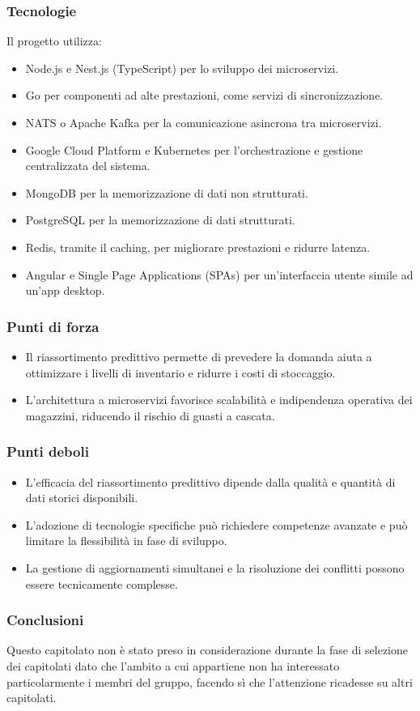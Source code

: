     \subsubsection{Tecnologie}
    Il progetto utilizza:

\begin{itemize}
    \item Node.js e Nest.js (TypeScript) per lo sviluppo dei microservizi.
    \item Go per componenti ad alte prestazioni, come servizi di sincronizzazione.
    \item NATS o Apache Kafka per la comunicazione asincrona tra microservizi.
    \item Google Cloud Platform e Kubernetes per l’orchestrazione e gestione centralizzata del sistema.
    \item MongoDB per la memorizzazione di dati non strutturati.
    \item PostgreSQL per la memorizzazione di dati strutturati.
    \item Redis, tramite il caching, per migliorare prestazioni e ridurre latenza.
    \item Angular e Single Page Applications (SPAs) per un’interfaccia utente simile ad un’app desktop.
\end{itemize}
    \subsubsection{Punti di forza}
   \begin{itemize}
    \item Il riassortimento predittivo permette di prevedere la domanda aiuta a ottimizzare i livelli di inventario e ridurre i costi di stoccaggio.
    \item L’architettura a microservizi favorisce scalabilità e indipendenza operativa dei magazzini, riducendo il rischio di guasti a cascata.
\end{itemize}
    \subsubsection{Punti deboli}
    \begin{itemize}
    \item L’efficacia del riassortimento predittivo dipende dalla qualità e quantità di dati storici disponibili.
    \item L’adozione di tecnologie specifiche può richiedere competenze avanzate e può limitare la flessibilità in fase di sviluppo.
    \item La gestione di aggiornamenti simultanei e la risoluzione dei conflitti possono essere tecnicamente complesse.
\end{itemize}
    \subsubsection{Conclusioni}
    Questo capitolato non è stato preso in considerazione durante la fase di selezione dei capitolati dato che l’ambito a cui appartiene non ha interessato particolarmente i membri del gruppo, facendo sì che l’attenzione ricadesse su altri capitolati.
